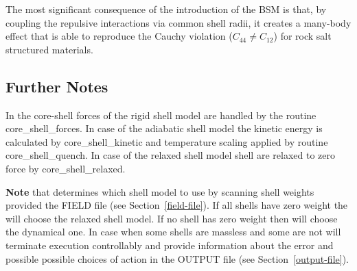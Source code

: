 The most significant consequence of the introduction of the BSM is that,
by coupling the repulsive interactions via common shell radii, it creates
a many-body effect that is able to reproduce the Cauchy violation
($C_{44} \ne C_{12}$) for rock salt structured materials.

\subsection{Further Notes}

In \D the core-shell forces of the rigid shell model are handled
by the routine {\sc core\_shell\_forces}.  In case of the adiabatic
shell model the kinetic energy is calculated by {\sc core\_shell\_kinetic}
and temperature scaling applied by routine {\sc core\_shell\_quench}.
In case of the relaxed shell model shell are relaxed to zero force
by {\sc core\_shell\_relaxed}.

{\bf Note} that \D determines which shell model to use by scanning
shell weights provided the FIELD file (see Section~\ref{field-file}).
If all shells have zero weight the \D will choose the relaxed shell
model.  If no shell has zero weight then \D will choose the dynamical
one.  In case when some shells are massless and some are not \D will
terminate execution controllably and provide information about the
error and possible possible choices of action in the OUTPUT file
(see Section~\ref{output-file}).


